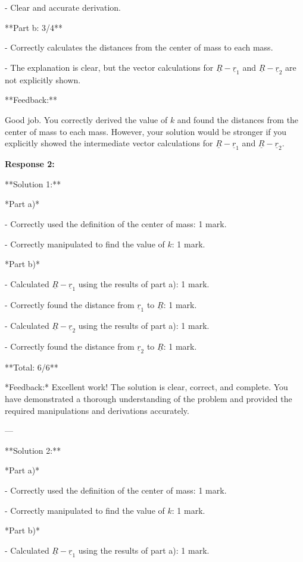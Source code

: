 \documentclass[a4paper,11pt]{article}
\begin{document}
- Clear and accurate derivation.

**Part b: 3/4**

- Correctly calculates the distances from the center of mass to each mass.

- The explanation is clear, but the vector calculations for \( \underline{R} - \underline{r}_1 \) and \( \underline{R} - \underline{r}_2 \) are not explicitly shown.

**Feedback:**

Good job. You correctly derived the value of \( k \) and found the distances from the center of mass to each mass. However, your solution would be stronger if you explicitly showed the intermediate vector calculations for \( \underline{R} - \underline{r}_1 \) and \( \underline{R} - \underline{r}_2 \).

\bigskip
\textbf{Response 2:}

**Solution 1:**

*Part a)*

- Correctly used the definition of the center of mass: 1 mark.

- Correctly manipulated to find the value of \( k \): 1 mark.

*Part b)*

- Calculated \(\underline{R} - \underline{r}_1\) using the results of part a): 1 mark.

- Correctly found the distance from \(\underline{r}_1\) to \(\underline{R}\): 1 mark.

- Calculated \(\underline{R} - \underline{r}_2\) using the results of part a): 1 mark.

- Correctly found the distance from \(\underline{r}_2\) to \(\underline{R}\): 1 mark.

**Total: 6/6**

*Feedback:* Excellent work! The solution is clear, correct, and complete. You have demonstrated a thorough understanding of the problem and provided the required manipulations and derivations accurately.

---

**Solution 2:**

*Part a)*

- Correctly used the definition of the center of mass: 1 mark.

- Correctly manipulated to find the value of \( k \): 1 mark.

*Part b)*

- Calculated \(\underline{R} - \underline{r}_1\) using the results of part a): 1 mark.
\end{document}
